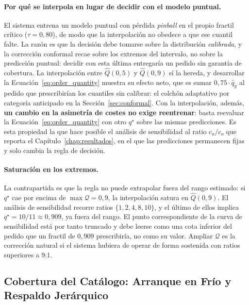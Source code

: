 \paragraph{Por qué se interpola en lugar de decidir con el modelo puntual.} El sistema entrena un modelo puntual con pérdida \textit{pinball} en el propio fractil crítico ($\tau = 0{,}80$), de modo que la interpolación no obedece a que ese cuantil falte. La razón es que la decisión debe tomarse sobre la distribución \emph{calibrada}, y la corrección conformal recae sobre los extremos del intervalo, no sobre la predicción puntual: decidir con esta última entregaría un pedido sin garantía de cobertura. La interpolación entre $\hat{Q}(0{,}5)$ y $\hat{Q}(0{,}9)$ sí la hereda, y desarrollar la Ecuación~\ref{eq:order_quantity} muestra su efecto neto, que es sumar $0{,}75 \cdot \hat{q}_g$ al pedido que prescribirían los cuantiles sin calibrar: el colchón adaptativo por categoría anticipado en la Sección~\ref{sec:conformal}. Con la interpolación, además, \textbf{un cambio en la asimetría de costes no exige reentrenar}: basta reevaluar la Ecuación~\ref{eq:order_quantity} con otro $q^\star$ sobre las mismas predicciones. Es esta propiedad la que hace posible el análisis de sensibilidad al ratio $c_u/c_o$ que reporta el Capítulo~\ref{chap:resultados}, en el que las predicciones permanecen fijas y solo cambia la regla de decisión.

\paragraph{Saturación en los extremos.} La contrapartida es que la regla no puede extrapolar fuera del rango estimado: si $q^\star$ cae por encima de $\max \mathcal{Q} = 0{,}9$, la interpolación satura en $\hat{Q}(0{,}9)$. El análisis de sensibilidad recorre ratios $\{1, 2, 4, 8, 10\}$, y el último de ellos implica $q^\star = 10/11 \approx 0{,}909$, ya fuera del rango. El punto correspondiente de la curva de sensibilidad está por tanto truncado y debe leerse como una cota inferior del pedido que un fractil de $0{,}909$ prescribiría, no como su valor. Ampliar $\mathcal{Q}$ es la corrección natural si el sistema hubiera de operar de forma sostenida con ratios superiores a 9:1.

\subsection{Cobertura del Catálogo: Arranque en Frío y Respaldo Jerárquico}
\label{sec:cold_start}

